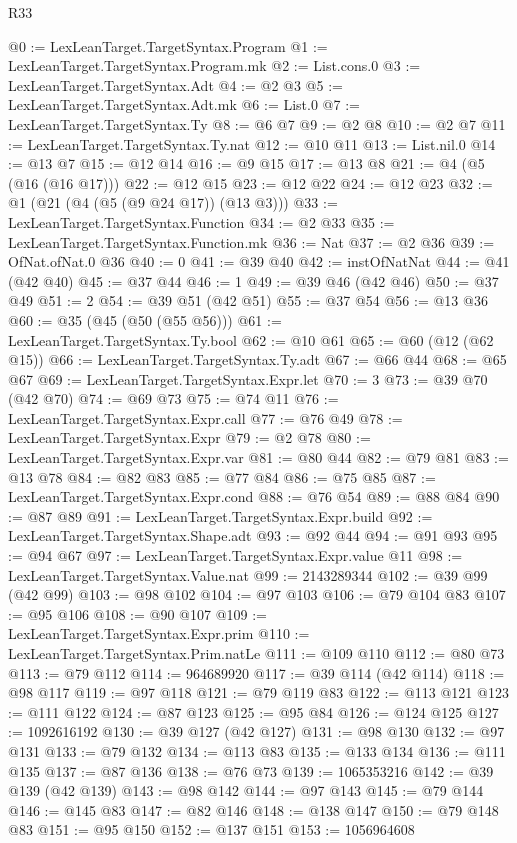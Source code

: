 \begin{lexlean}{R33}
\begin{coremodule}
@0 := LexLeanTarget.TargetSyntax.Program
@1 := LexLeanTarget.TargetSyntax.Program.mk
@2 := List.cons.{0}
@3 := LexLeanTarget.TargetSyntax.Adt
@4 := @2 @3
@5 := LexLeanTarget.TargetSyntax.Adt.mk
@6 := List.{0}
@7 := LexLeanTarget.TargetSyntax.Ty
@8 := @6 @7
@9 := @2 @8
@10 := @2 @7
@11 := LexLeanTarget.TargetSyntax.Ty.nat
@12 := @10 @11
@13 := List.nil.{0}
@14 := @13 @7
@15 := @12 @14
@16 := @9 @15
@17 := @13 @8
@21 := @4 (@5 (@16 (@16 @17)))
@22 := @12 @15
@23 := @12 @22
@24 := @12 @23
@32 := @1 (@21 (@4 (@5 (@9 @24 @17)) (@13 @3)))
@33 := LexLeanTarget.TargetSyntax.Function
@34 := @2 @33
@35 := LexLeanTarget.TargetSyntax.Function.mk
@36 := Nat
@37 := @2 @36
@39 := OfNat.ofNat.{0} @36
@40 := 0
@41 := @39 @40
@42 := instOfNatNat
@44 := @41 (@42 @40)
@45 := @37 @44
@46 := 1
@49 := @39 @46 (@42 @46)
@50 := @37 @49
@51 := 2
@54 := @39 @51 (@42 @51)
@55 := @37 @54
@56 := @13 @36
@60 := @35 (@45 (@50 (@55 @56)))
@61 := LexLeanTarget.TargetSyntax.Ty.bool
@62 := @10 @61
@65 := @60 (@12 (@62 @15))
@66 := LexLeanTarget.TargetSyntax.Ty.adt
@67 := @66 @44
@68 := @65 @67
@69 := LexLeanTarget.TargetSyntax.Expr.let
@70 := 3
@73 := @39 @70 (@42 @70)
@74 := @69 @73
@75 := @74 @11
@76 := LexLeanTarget.TargetSyntax.Expr.call
@77 := @76 @49
@78 := LexLeanTarget.TargetSyntax.Expr
@79 := @2 @78
@80 := LexLeanTarget.TargetSyntax.Expr.var
@81 := @80 @44
@82 := @79 @81
@83 := @13 @78
@84 := @82 @83
@85 := @77 @84
@86 := @75 @85
@87 := LexLeanTarget.TargetSyntax.Expr.cond
@88 := @76 @54
@89 := @88 @84
@90 := @87 @89
@91 := LexLeanTarget.TargetSyntax.Expr.build
@92 := LexLeanTarget.TargetSyntax.Shape.adt
@93 := @92 @44
@94 := @91 @93
@95 := @94 @67
@97 := LexLeanTarget.TargetSyntax.Expr.value @11
@98 := LexLeanTarget.TargetSyntax.Value.nat
@99 := 2143289344
@102 := @39 @99 (@42 @99)
@103 := @98 @102
@104 := @97 @103
@106 := @79 @104 @83
@107 := @95 @106
@108 := @90 @107
@109 := LexLeanTarget.TargetSyntax.Expr.prim
@110 := LexLeanTarget.TargetSyntax.Prim.natLe
@111 := @109 @110
@112 := @80 @73
@113 := @79 @112
@114 := 964689920
@117 := @39 @114 (@42 @114)
@118 := @98 @117
@119 := @97 @118
@121 := @79 @119 @83
@122 := @113 @121
@123 := @111 @122
@124 := @87 @123
@125 := @95 @84
@126 := @124 @125
@127 := 1092616192
@130 := @39 @127 (@42 @127)
@131 := @98 @130
@132 := @97 @131
@133 := @79 @132
@134 := @113 @83
@135 := @133 @134
@136 := @111 @135
@137 := @87 @136
@138 := @76 @73
@139 := 1065353216
@142 := @39 @139 (@42 @139)
@143 := @98 @142
@144 := @97 @143
@145 := @79 @144
@146 := @145 @83
@147 := @82 @146
@148 := @138 @147
@150 := @79 @148 @83
@151 := @95 @150
@152 := @137 @151
@153 := 1056964608

\end{coremodule}
\end{lexlean}
